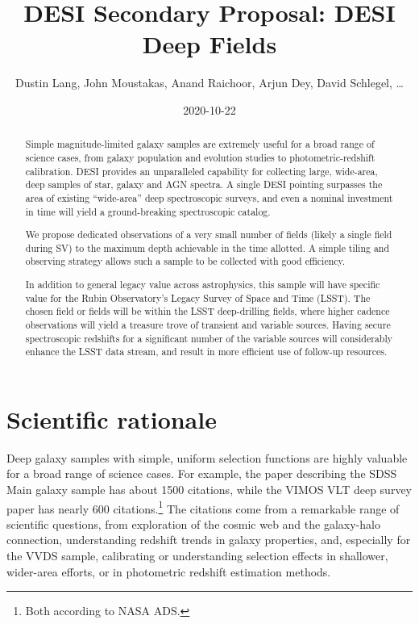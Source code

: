 \documentclass{aastex63}
\begin{document}
\title{DESI Secondary Proposal: DESI Deep Fields}

\suppressAffiliations

\author{Dustin Lang, John Moustakas, Anand Raichoor, Arjun Dey,
  David Schlegel, \ldots}
\date{2020-10-22}


\begin{abstract}
Simple magnitude-limited galaxy samples are extremely useful for a
broad range of science cases, from galaxy population and evolution
studies to photometric-redshift calibration.  DESI provides an
unparalleled capability for collecting large, wide-area, deep samples
of star, galaxy and AGN spectra.  A single DESI pointing surpasses the
area of existing ``wide-area'' deep spectroscopic surveys, and even a
nominal investment in time will yield a ground-breaking spectroscopic
catalog.

We propose dedicated observations of a very small number of fields
(likely a single field during SV) to the maximum depth achievable in
the time allotted.  A simple tiling and observing strategy allows such
a sample to be collected with good efficiency.

In addition to general legacy value across astrophysics, this sample
will have specific value for the Rubin Observatory's Legacy Survey of
Space and Time (LSST).  The chosen field or fields will be within the
LSST deep-drilling fields, where higher cadence observations will
yield a treasure trove of transient and variable sources.  Having
secure spectroscopic redshifts for a significant number of the
variable sources will considerably enhance the LSST data stream,
and result in more efficient use of follow-up resources.
\end{abstract}

\section{Scientific rationale}

Deep galaxy samples with simple, uniform selection functions are
highly valuable for a broad range of science cases.  For example, the
paper describing the SDSS Main galaxy sample \citep{sdssmain} has
about 1500 citations, while the VIMOS VLT deep survey paper
\citep{vvds} has nearly 600 citations.\footnote{Both according to NASA
  ADS.}  The citations come from a remarkable range of scientific
questions, from exploration of the cosmic web and the galaxy-halo
connection, understanding redshift trends in galaxy properties, and,
especially for the VVDS sample, calibrating or understanding selection
effects in shallower, wider-area efforts, or in photometric redshift
estimation methods.
\end{document}
